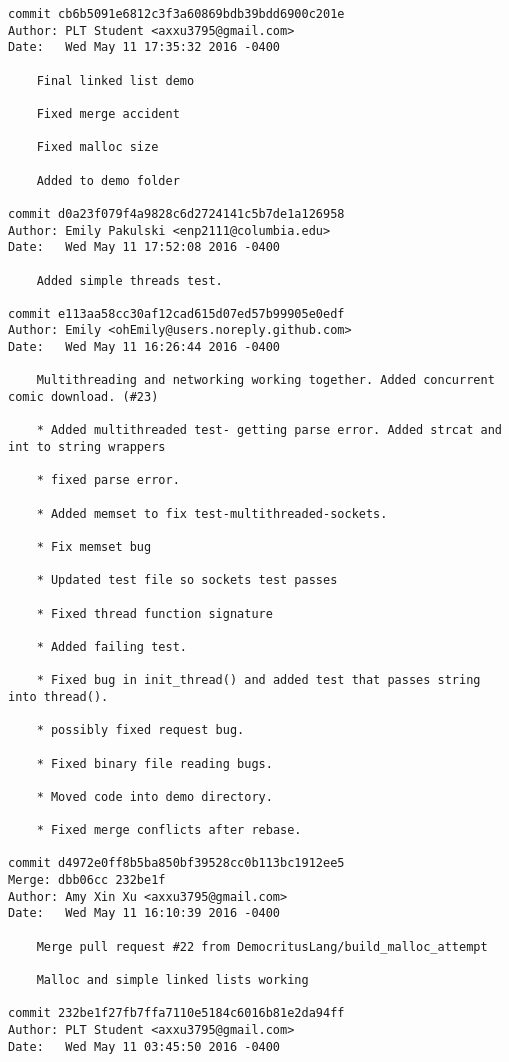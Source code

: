     \begin{lstlisting}[backgroundcolor=\color{white}]
commit cb6b5091e6812c3f3a60869bdb39bdd6900c201e
Author: PLT Student <axxu3795@gmail.com>
Date:   Wed May 11 17:35:32 2016 -0400

    Final linked list demo
    
    Fixed merge accident
    
    Fixed malloc size
    
    Added to demo folder

commit d0a23f079f4a9828c6d2724141c5b7de1a126958
Author: Emily Pakulski <enp2111@columbia.edu>
Date:   Wed May 11 17:52:08 2016 -0400

    Added simple threads test.

commit e113aa58cc30af12cad615d07ed57b99905e0edf
Author: Emily <ohEmily@users.noreply.github.com>
Date:   Wed May 11 16:26:44 2016 -0400

    Multithreading and networking working together. Added concurrent comic download. (#23)
    
    * Added multithreaded test- getting parse error. Added strcat and int to string wrappers
    
    * fixed parse error.
    
    * Added memset to fix test-multithreaded-sockets.
    
    * Fix memset bug
    
    * Updated test file so sockets test passes
    
    * Fixed thread function signature
    
    * Added failing test.
    
    * Fixed bug in init_thread() and added test that passes string into thread().
    
    * possibly fixed request bug.
    
    * Fixed binary file reading bugs.
    
    * Moved code into demo directory.
    
    * Fixed merge conflicts after rebase.

commit d4972e0ff8b5ba850bf39528cc0b113bc1912ee5
Merge: dbb06cc 232be1f
Author: Amy Xin Xu <axxu3795@gmail.com>
Date:   Wed May 11 16:10:39 2016 -0400

    Merge pull request #22 from DemocritusLang/build_malloc_attempt
    
    Malloc and simple linked lists working

commit 232be1f27fb7ffa7110e5184c6016b81e2da94ff
Author: PLT Student <axxu3795@gmail.com>
Date:   Wed May 11 03:45:50 2016 -0400


\end{lstlisting}

